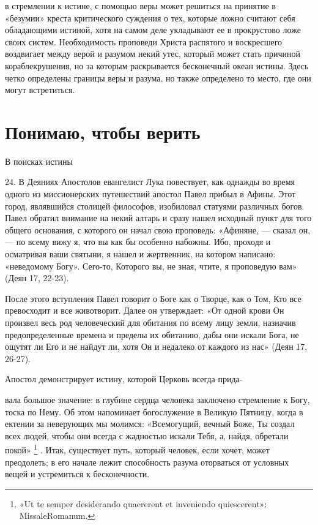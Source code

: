 \documentclass[a5paper,10pt]{article}
\begin{document}
в стремлении к истине, с помощью веры может решиться на принятие в «безумии»
креста критического суждения о тех, которые ложно считают себя обладающими
истиной, хотя на самом деле укладывают ее в прокрустово ложе своих систем.
Необходимость проповеди Христа распятого и воскресшего воздвигает между верой и
разумом некий утес, который может стать причиной кораблекрушения, но за которым
раскрывается бесконечный океан истины. Здесь четко определены границы веры и
разума, но также определено то место, где они могут встретиться.

\section{Понимаю, чтобы верить}

В поисках истины

24. В Деяниях Апостолов евангелист Лука повествует, как однажды во время одного
из миссионерских путешествий апостол Павел прибыл в Афины. Этот город,
являвшийся столицей философов, изобиловал статуями различных богов. Павел
обратил внимание на некий алтарь и сразу нашел исходный пункт для того общего
основания, с которого он начал свою проповедь: «Афиняне, — сказал он, — по
всему вижу я, что вы как бы особенно набожны. Ибо, проходя и осматривая ваши
святыни, я нашел и жертвенник, на котором написано: «неведомому Богу». Сего-то,
Которого вы, не зная, чтите, я проповедую вам» (Деян 17, 22-23).

После этого вступления Павел говорит о Боге как о Творце, как о Том, Кто все
превосходит и все животворит. Далее он утверждает: «От одной крови Он произвел
весь род человеческий для обитания по всему лицу земли, назначив
предопределенные времена и пределы их обитанию, дабы они искали Бога, не ощутят
ли Его и не найдут ли, хотя Он и недалеко от каждого из нас» (Деян 17, 26-27).

Апостол демонстрирует истину, которой Церковь всегда прида-

вала большое значение: в глубине сердца человека заключено стремление к Богу,
тоска по Нему. Об этом напоминает богослужение в Великую Пятницу, когда в
ектении за неверующих мы молимся: «Всемогущий, вечный Боже, Ты создал всех
людей, чтобы они всегда с жадностью искали Тебя, а, найдя, обретали покой»
\footnote{«Ut te semper desiderando quaererent et inveniendo quiescerent»:
MissaleRomanum.} .  Итак, существует путь, который человек, если хочет, может
преодолеть; в его начале лежит способность разума оторваться от условных вещей
и устремиться к бесконечности.
\end{document}
